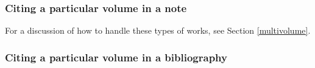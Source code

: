 \documentclass[11pt,letterpaper,oneside]{article}
\begin{document}
\begin{citebib}
\item \cite{aristotle1983}
\item \cite{byrne1981}
\item \cite{james1962}
\end{citebib}

\subsubsection{Citing a particular volume in a note}
\label{14.118}

For a discussion of how to handle these types of works, see Section
\ref{multivolume}.

\begin{citebib}
\item \cite[4:243]{byrne1981}
\item \cite*[32--33]{james1963.5}
\item \cite[4:245]{byrne1981}
\item \cite*[34]{james1963.5}
\end{citebib}

\subsubsection{Citing a particular volume in a bibliography}

\begin{citebib}
\item \cite{armstrong2014}
\end{citebib}


\end{document}
